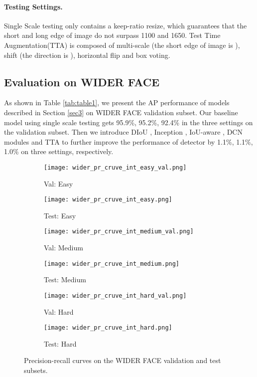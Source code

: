 \documentclass[final]{cvpr}
\begin{document}
\paragraph{Testing Settings.}
Single Scale testing only contains a keep-ratio resize, which guarantees that the short and long edge of image do not surpass 1100 and 1650. Test Time Augmentation(TTA) is composed of multi-scale (the short edge of image is ), shift (the direction is ), horizontal flip and box voting.

\subsection{Evaluation on WIDER FACE}
As shown in Table \ref{tab:table1}, we present the AP performance of models described in Section \ref{sec3} on WIDER FACE validation subset. Our baseline model using single scale testing gets 95.9\%, 95.2\%, 92.4\% in the three settings on the validation subset. Then we introduce DIoU \cite{zheng2020distance}, Inception \cite{szegedy2015going}, IoU-aware \cite{wu2020iou}, DCN \cite{dai2017deformable} modules and TTA to further improve the performance of detector by 1.1\%, 1.1\%, 1.0\% on three settings, respectively.

\begin{figure*}[ht]
\centering
\begin{subfigure}{.5\textwidth}
  \centering
  \texttt{[image: wider\_pr\_cruve\_int\_easy\_val.png]}
  \caption{Val: Easy}
  \label{fig3:sub1}
\end{subfigure}\begin{subfigure}{.5\textwidth}
  \centering
  \texttt{[image: wider\_pr\_cruve\_int\_easy.png]}
  \caption{Test: Easy}
  \label{fig3:sub2}
\end{subfigure}

\begin{subfigure}{.5\textwidth}
  \centering
  \texttt{[image: wider\_pr\_cruve\_int\_medium\_val.png]}
  \caption{Val: Medium}
  \label{fig3:sub3}
\end{subfigure}\begin{subfigure}{.5\textwidth}
  \centering
  \texttt{[image: wider\_pr\_cruve\_int\_medium.png]}
  \caption{Test: Medium}
  \label{fig3:sub4}
\end{subfigure}

\begin{subfigure}{.5\textwidth}
  \centering
  \texttt{[image: wider\_pr\_cruve\_int\_hard\_val.png]}
  \caption{Val: Hard}
  \label{fig3:sub5}
\end{subfigure}\begin{subfigure}{.5\textwidth}
  \centering
  \texttt{[image: wider\_pr\_cruve\_int\_hard.png]}
  \caption{Test: Hard}
  \label{fig3:sub6}
\end{subfigure}

\caption{Precision-recall curves on the WIDER FACE validation and test subsets.}
\label{fig:fig3}
\end{figure*}
\end{document}
